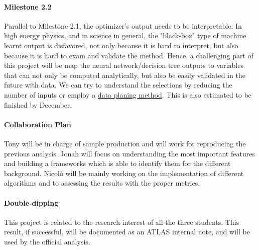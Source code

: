 \documentclass[11pt]{article}
\begin{document}
\paragraph{Milestone 2.2}
Parallel to Milestone 2.1, the optimizer's output needs to be interpretable. In high energy physics, and in science in general, the "black-box" type of machine learnt output is disfavored, not only because it is hard to interpret, but also because it is hard to exam and validate the method. Hence, a challenging part of this project will be map the neural network/decision tree outputs to variables that can not only be computed analytically, but also be easily validated in the future with data. We can try to understand the selections by reducing the number of inputs or employ a \href{https://arxiv.org/pdf/1709.10106.pdf}{data planing method}. This is also estimated to be finished by December.

\paragraph{Collaboration Plan}
Tony will be in charge of sample production and will work for reproducing the previous analysis.
Jonah will focus on understanding the most important features and building a frameworks which is able to identify them for the different background.
Nicolò will be mainly working on the implementation of different algorithms and to assessing the results with the proper metrics.

\paragraph{Double-dipping}
This project is related to the research interest of all the three students. This result, if successful, will be documented as an ATLAS internal note, and will be used by the official analysis.
\end{document}
